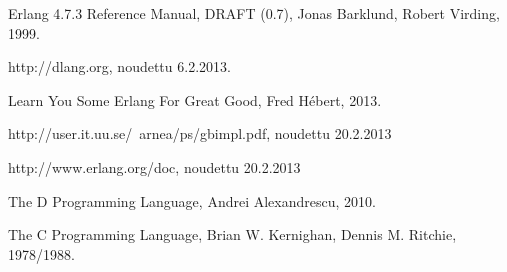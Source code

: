 \documentclass[11pt,oneside,a4paper]{article}
\begin{document}



\begin{thebibliography}{99}

 Erlang 4.7.3 Reference Manual, DRAFT (0.7), Jonas
Barklund, Robert Virding, 1999. 

 http://dlang.org, noudettu 6.2.2013.

 Learn You Some Erlang For Great Good, Fred Hébert, 2013.

 http://user.it.uu.se/~arnea/ps/gbimpl.pdf, noudettu
20.2.2013

 http://www.erlang.org/doc, noudettu 20.2.2013

 The D Programming Language, Andrei Alexandrescu, 2010.

 The C Programming Language, Brian W. Kernighan, Dennis M.
Ritchie, 1978/1988.


\end{thebibliography}
\end{document}
